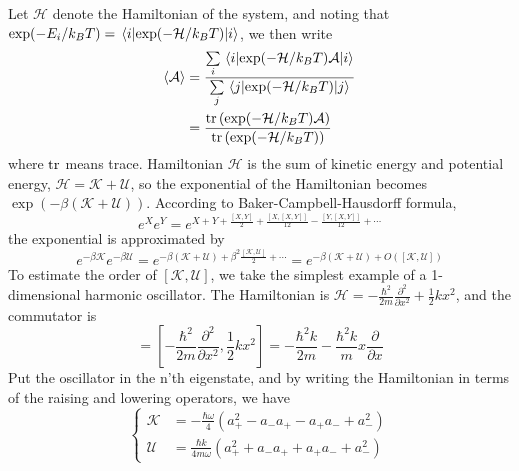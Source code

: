 \documentclass[letterpaper,12pt]{article}
\numberwithin{equation}{section}
\begin{document}
Let $\mathcal{H}$ denote the Hamiltonian of the system, and noting that $\exp(-E_i/k_BT)=\matrixelement{i}{\exp(-\mathcal{H}/k_BT)}{i}$, we then write
\begin{equation}
    \begin{aligned}
        \left\langle \mathcal{A}\right\rangle&=\frac{\sum\limits_i{\matrixelement{i}{\exp(-\mathcal{H}/k_BT)\mathcal{A}}{i}}}{\sum\limits_j{\matrixelement{j}{\exp(-\mathcal{H}/k_BT)}{j}}} \\
        &=\frac{\tr\left(\exp(-\mathcal{H}/k_BT)\mathcal{A}\right)}{\tr\left(\exp(-\mathcal{H}/k_BT)\right)}
    \end{aligned}
\end{equation}
where $\tr$ means trace. Hamiltonian $\mathcal{H}$ is the sum of kinetic energy and potential energy, $\mathcal{H}=\mathcal{K}+\mathcal{U}$, so the exponential of the Hamiltonian becomes $\exp(-\beta(\mathcal{K}+\mathcal{U}))$.  According to Baker-Campbell-Hausdorff formula, 
\begin{equation}
    e^{X}e^Y=e^{X+Y+\frac{[X,Y]}{2}+\frac{[X,[X,Y]]}{12}-\frac{[Y,[X,Y]]}{12}+\cdots}
\end{equation}
the exponential is approximated by 
\begin{equation}
    e^{-\beta\mathcal{K}}e^{-\beta\mathcal{U}}=e^{-\beta(\mathcal{K}+\mathcal{U})+\beta^2\frac{[\mathcal{K},\mathcal{U}]}{2}+\cdots}=e^{-\beta(\mathcal{K}+\mathcal{U})+O([\mathcal{K},\mathcal{U}])}
    \label{Eq:appro}
\end{equation}
To estimate the order of $[\mathcal{K},\mathcal{U}]$, we take the simplest example of a 1-dimensional harmonic oscillator. The Hamiltonian is $\mathcal{H}=-\frac{\hbar^2}{2m}\frac{\partial^2}{\partial x^2}+\frac{1}{2}kx^2$, and the commutator is 
\begin{equation}
    [\mathcal{K},\mathcal{U}]=\left[-\frac{\hbar^2}{2m}\frac{\partial^2}{\partial x^2},\frac{1}{2}kx^2\right]=-\frac{\hbar^2k}{2m}-\frac{\hbar^2k}{m}x\frac{\partial}{\partial x}
\end{equation}
Put the oscillator in the n'th eigenstate, and by writing the Hamiltonian in terms of the raising and lowering operators, we have 
\begin{equation}
    \left\{
        \begin{aligned}
            \mathcal{K} &=-\frac{\hbar\omega}{4}(a_+^2-a_-a_+-a_+a_-+a_-^2) \\
            \mathcal{U} &=\frac{\hbar k}{4m\omega}(a_+^2+a_-a_++a_+a_-+a_-^2)
        \end{aligned}
    \right.
\end{equation}
\end{document}
